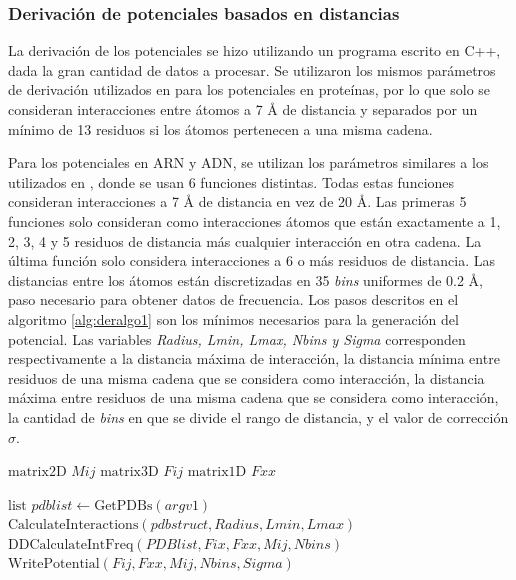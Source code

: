 \subsubsection{Derivación de potenciales basados en distancias}
\par
La derivación de los potenciales se hizo utilizando un programa escrito en C++, dada la gran cantidad de datos a procesar.
Se utilizaron los mismos parámetros de derivación utilizados en \cite{Melo1998} para los potenciales en proteínas, por lo que solo se consideran interacciones entre átomos a 7 \si{\angstrom} de distancia y separados por un mínimo de 13 residuos si los átomos pertenecen a una misma cadena.

\par
Para los potenciales en ARN y ADN, se utilizan los parámetros similares a los utilizados en \cite{Capriotti2011}, donde se usan 6 funciones distintas. Todas estas funciones consideran interacciones a 7 \si{\angstrom} de distancia en vez de 20 \si{\angstrom}.
Las primeras 5 funciones solo consideran como interacciones átomos que están exactamente a 1, 2, 3, 4 y 5 residuos de distancia más cualquier interacción en otra cadena. 
La última función solo considera interacciones a 6 o más residuos de distancia.
Las distancias entre los átomos están discretizadas en 35 \textit{bins} uniformes de 0.2 \si{\angstrom}, paso necesario para obtener datos de frecuencia.
Los pasos descritos en el algoritmo \ref{alg:deralgo1} son los mínimos necesarios para la generación del potencial. 
Las variables \textit{Radius, Lmin, Lmax, Nbins y Sigma} corresponden respectivamente a la distancia máxima de interacción, la distancia mínima entre residuos de una misma cadena que se considera como interacción, la distancia máxima entre residuos de una misma cadena que se considera como interacción, la cantidad de \textit{bins} en que se divide el rango de distancia, y el valor de corrección $\sigma$.

\begin{algorithm}[H]
\caption{Pasos para la derivación de un potencial a partir de una lista de archivos PDB}\label{alg:deralgo1}
\begin{algorithmic}[0]
\State $ \text{matrix2D } Mij $ 
\State $ \text{matrix3D } Fij $ 
\State $ \text{matrix1D } Fxx $ 

\State $ \text{list } pdblist \gets \text{GetPDBs}(argv1) $ 
\State $ \text{CalculateInteractions}(pdbstruct,Radius,Lmin,Lmax) $ 
\EndFor
\State $ \text{DDCalculateIntFreq}(PDBlist,Fix,Fxx,Mij,Nbins) $ 
\State $ \text{WritePotential}(Fij,Fxx,Mij,Nbins,Sigma) $ 
\EndProcedure
\end{algorithmic}
\end{algorithm}


